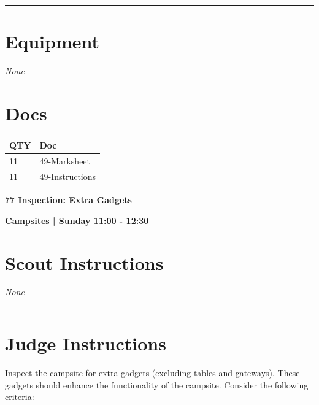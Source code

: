 \documentclass[10pt]{article}
\newcommand{\newtitle}[1]{\begin{center}{\Huge\bfseries #1 }\\ \vspace{5mm}\end{center}}
\newcommand{\newsubtitle}[1]{\begin{center}{\color{grey}\Large\bfseries #1 }\\ \vspace{5mm}\end{center}}
\begin{document}
			\vspace{0.5cm}
	\hrule
	\vspace{0.5cm}

	\begin{multicols}{2}

		\section*{\faWrench \: Equipment}

				\textit{None}
		
		\vfill\null
		\columnbreak

			\section*{\faFile \: Docs}
		 	\begin{center}
			\begin{tabular}{p{2cm}p{4cm}}

			\textbf{QTY} & \textbf{Doc} \\\toprule
										11&49-Marksheet\\\midrule
										11&49-Instructions\\\midrule
							\end{tabular}
			\end{center}
	

		\vfill\null

		\end{multicols}



	\vspace{1cm}


	\clearpage
		\newtitle{77 Inspection: Extra Gadgets }
	\newsubtitle{Campsites | Sunday 11:00 - 12:30}
		\setcounter{section}{76}
	\section*{Scout Instructions}
		\textit{None}
	
	\vspace{0.5cm}
	\hrule
	\vspace{0.5cm}

		\section*{Judge Instructions}
		Inspect the campsite for extra gadgets (excluding tables and gateways). These gadgets should enhance the functionality of the campsite. Consider the following criteria:
\end{document}
